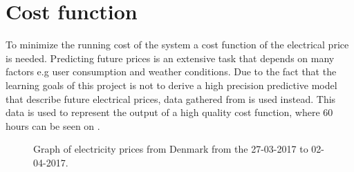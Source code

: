 \section{Cost function}\label{sec:cost_fkt}


To minimize the running cost of the system a cost function of the electrical price is needed. Predicting future prices is an extensive task that depends on many factors e.g user consumption and weather conditions. Due to the fact that the learning goals of this project is not to derive a high precision predictive model that describe future electrical prices, data gathered from \cite{Electrical_price} is used instead. This data is used to represent the output of a high quality cost function, where 60 hours can be seen on . 





	


\begin{figure}[H]
\centering

\caption{Graph of electricity prices from Denmark from the 27-03-2017 to 02-04-2017.}
\label{fig:electrical_price} 
\end{figure}

